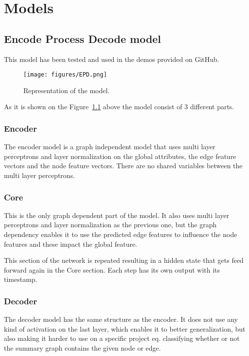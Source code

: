 \chapter{Models}\label{sect:Models}


\section{Encode Process Decode model}
This model has been tested and used in the demos provided on GitHub.
\begin{figure}[!ht]
	\centering
	\texttt{[image: figures/EPD.png]}
	\caption{Representation of the model.}
	\label{fig:encode-process-decode}
\end{figure}

As it is shown on the Figure~\ref{fig:encode-process-decode} above the model consist of 3 different parts.

\subsection{Encoder}
The encoder model is a graph independent model that uses multi layer perceptrons and layer normalization on the global attributes, the edge feature vectors and the node feature vectors. There are no shared variables between the multi layer perceptrons.

\subsection{Core}
This is the only graph dependent part of the model. It also uses multi layer perceptrons and layer normalization as the previous one, but the graph dependency enables it to use the predicted edge features to influence the node features and these impact the global feature.

This section of the network is repeated resulting in a hidden state that gets feed forward again in the Core section. Each step has its own output with its timestamp.

\subsection{Decoder}
The decoder model has the same structure as the encoder. It does not use any kind of activation on the last layer, which enables it to better generalization, but also making it harder to use on a specific project eq. classifying whether or not the summary graph contains the given node or edge.

